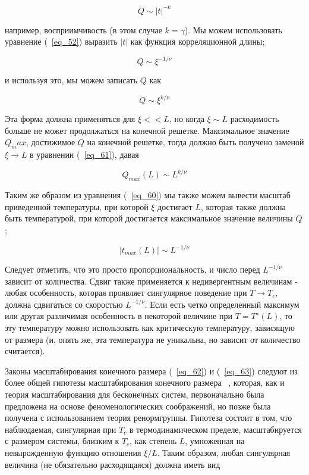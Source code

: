 \documentclass[11pt]{article}
\begin{document}
\begin{equation}
Q \sim |t|^{-k}
\label{eq_59}
\end{equation}

например, восприимчивость (в этом случае $k = \gamma$). Мы можем использовать уравнение (~\ref{eq_52}) выразить $| t |$ как функция корреляционной длины;

\begin{equation}
Q \sim \xi^{-1/\nu }
\label{eq_60}
\end{equation}

и используя это, мы можем записать $Q$ как

\begin{equation}
Q \sim \xi^{k/\nu }
\label{eq_61}
\end{equation}

Эта форма должна применяться для $\xi << L$, но когда $\xi \sim L$ расходимость больше не может продолжаться на конечной решетке. Максимальное значение $Q_max$, достижимое $Q$ на конечной решетке, тогда должно быть получено заменой $\xi → L$ в уравнении (~\ref{eq_61}), давая

\begin{equation}
Q_{max}(L) \sim L^{k/\nu }
\label{eq_62}
\end{equation}

Таким же образом из уравнения (~\ref{eq_60}) мы также можем вывести масштаб приведенной температуры, при которой $\xi$ достигает $L$, которая также должна быть температурой, при которой достигается максимальное значение величины $Q$;

\begin{equation}
|t_{max}(L)| \sim L^{-1/\nu }
\label{eq_63}
\end{equation}

Следует отметить, что это просто пропорциональность, и число перед $L^{−1 / \nu }$ зависит от количества. Сдвиг также применяется к недивергентным величинам - любая особенность, которая проявляет сингулярное поведение при $T → T_c$, должна сдвигаться со скоростью $L^{−1 / \nu }$. Если есть четко определенный максимум или другая различимая особенность в некоторой величине при $T = T^{∗} (L)$, то эту температуру можно использовать как критическую температуру, зависящую от размера (и, опять же, эта температура не уникальна, но зависит от количество считается).

Законы масштабирования конечного размера (~\ref{eq_62}) и (~\ref{eq_63}) следуют из более общей гипотезы масштабирования конечного размера ~\cite{prl_28_1516}, которая, как и теория масштабирования для бесконечных систем, первоначально была предложена на основе феноменологических соображений, но позже была получена с использованием теория ренормгруппы. Гипотеза состоит в том, что наблюдаемая, сингулярная при $T_c$ в термодинамическом пределе, масштабируется с размером системы, близким к $T_c$, как степень $L$, умноженная на невырожденную функцию отношения $\xi / L$. Таким образом, любая сингулярная величина (не обязательно расходящаяся) должна иметь вид
\end{document}
